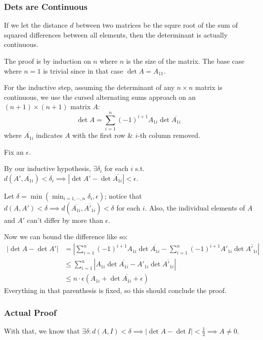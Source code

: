 \documentclass[12pt]{article}
\begin{document}
\subsubsection{Dets are Continuous}

If we let the distance $d$ between two matrices be the squre root of the sum
of squared differences between all elements, then the determinant is actually continuous.

The proof is by induction on $n$ where $n$ is the size of the matrix.
The base case where $n=1$ is trivial since in that case $\det A=A_{11}$.

For the inductive step, assuming the determinant of any $n \times n$ matrix is continuous,
we use the cursed alternating sums approach on an $(n+1) \times (n+1)$ matrix $A$:
\[\det A = \sum_{i=1}^{n} (-1)^{i+1} A_{1i} \det \overline{A_{1i}}\]
where $\overline{A_{1i}}$ indicates $A$ with the first row \& $i$-th column removed.

Fix an $\epsilon$.

By our inductive hypothesis, $\exists \delta_i$ for each $i$ s.t.
$d(A', \overline{A_{1i}}) < \delta_i \implies |\det A' - \det \overline{A_{1i}}| < \epsilon$.

Let $\delta=\min\left(\min_{i=1, \cdots, n} \delta_i, \epsilon\right)$;
notice that $d(A, A') < \delta \implies d(\overline{A_{1i}}, \overline{A'_{1i}}) < \delta$ for each $i$.
Also, the individual elements of $A$ and $A'$ can't differ by more than $\epsilon$.

Now we can bound the difference like so:
\begin{align*}
  |\det A - \det A'|
  &= \left|\sum_{i=1}^{n} (-1)^{i+1} A_{1i} \det \overline{A_{1i}} - \sum_{i=1}^{n} (-1)^{i+1} A'_{1i} \det \overline{A'_{1i}}\right| \\
  &\le \sum_{i=1}^{n} \left|A_{1i} \det \overline{A_{1i}} - A'_{1i} \det \overline{A'_{1i}}\right| \\
  &\le n \cdot \epsilon\left(A_{1i}+\det \overline{A_{1i}}+\epsilon\right)
\end{align*}
Everything in that parenthesis is fixed, so this should conclude the proof.

\subsubsection{Actual Proof}

With that, we know that $\exists \delta: d(A, I) < \delta \implies |\det A - \det I| < \frac{1}{2} \implies A \ne 0$.
\end{document}
